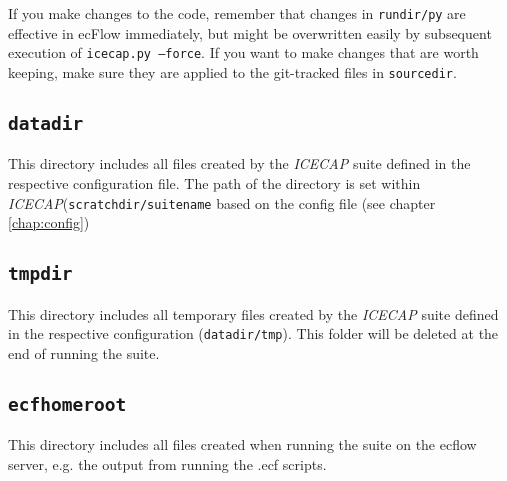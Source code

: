 \documentclass[DIV=10, parskip=full]{scrreprt}
\newcommand{\ice}{\textit{ICECAP}\xspace}
\begin{document}

If you make changes to the code, remember that changes in \texttt{rundir/py} are effective in ecFlow immediately, but might be overwritten easily by subsequent execution of \texttt{icecap.py --force}. If you want to make changes that are worth keeping, make sure they are applied to the git-tracked files in \texttt{sourcedir}.

\subsection{\texttt{datadir}}
This directory includes all files created by the \ice suite defined in the respective configuration file. The path of the directory is set within \ice  (\texttt{scratchdir/suitename} based on the config file (see chapter \ref{chap:config})\\


\subsection{\texttt{tmpdir}}
This directory includes all temporary files created by the \ice suite defined in the respective configuration (\texttt{datadir/tmp}). This folder will be deleted at the end of running the suite.

\subsection{\texttt{ecfhomeroot}}
This directory includes all files created when running the suite on the ecflow server, e.g. the output from running the .ecf scripts.
\end{document}
